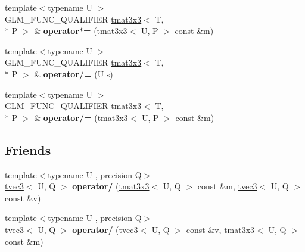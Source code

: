 \begin{DoxyCompactItemize}
\item 
\hypertarget{structglm_1_1tmat3x3_a569e06a5f10051a2022d0be0af4c5e7b}{{\footnotesize template$<$typename U $>$ }\\G\-L\-M\-\_\-\-F\-U\-N\-C\-\_\-\-Q\-U\-A\-L\-I\-F\-I\-E\-R \hyperlink{structglm_1_1tmat3x3}{tmat3x3}$<$ T, \\*
P $>$ \& {\bfseries operator$\ast$=} (\hyperlink{structglm_1_1tmat3x3}{tmat3x3}$<$ U, P $>$ const \&m)}\label{structglm_1_1tmat3x3_a569e06a5f10051a2022d0be0af4c5e7b}

\item 
\hypertarget{structglm_1_1tmat3x3_af0edea7ecc6cfc8344c91f9aeb0dcef4}{{\footnotesize template$<$typename U $>$ }\\G\-L\-M\-\_\-\-F\-U\-N\-C\-\_\-\-Q\-U\-A\-L\-I\-F\-I\-E\-R \hyperlink{structglm_1_1tmat3x3}{tmat3x3}$<$ T, \\*
P $>$ \& {\bfseries operator/=} (U s)}\label{structglm_1_1tmat3x3_af0edea7ecc6cfc8344c91f9aeb0dcef4}

\item 
\hypertarget{structglm_1_1tmat3x3_a0adc3f9a1be28dd0e4ea34c816b364fc}{{\footnotesize template$<$typename U $>$ }\\G\-L\-M\-\_\-\-F\-U\-N\-C\-\_\-\-Q\-U\-A\-L\-I\-F\-I\-E\-R \hyperlink{structglm_1_1tmat3x3}{tmat3x3}$<$ T, \\*
P $>$ \& {\bfseries operator/=} (\hyperlink{structglm_1_1tmat3x3}{tmat3x3}$<$ U, P $>$ const \&m)}\label{structglm_1_1tmat3x3_a0adc3f9a1be28dd0e4ea34c816b364fc}

\end{DoxyCompactItemize}
\subsection*{Friends}
\begin{DoxyCompactItemize}
\item 
\hypertarget{structglm_1_1tmat3x3_ac84f82f1605a6094a397c84daa80a201}{{\footnotesize template$<$typename U , precision Q$>$ }\\\hyperlink{structglm_1_1tvec3}{tvec3}$<$ U, Q $>$ {\bfseries operator/} (\hyperlink{structglm_1_1tmat3x3}{tmat3x3}$<$ U, Q $>$ const \&m, \hyperlink{structglm_1_1tvec3}{tvec3}$<$ U, Q $>$ const \&v)}\label{structglm_1_1tmat3x3_ac84f82f1605a6094a397c84daa80a201}

\item 
\hypertarget{structglm_1_1tmat3x3_a62cedcc444ac62727b8ae82f6b3249b8}{{\footnotesize template$<$typename U , precision Q$>$ }\\\hyperlink{structglm_1_1tvec3}{tvec3}$<$ U, Q $>$ {\bfseries operator/} (\hyperlink{structglm_1_1tvec3}{tvec3}$<$ U, Q $>$ const \&v, \hyperlink{structglm_1_1tmat3x3}{tmat3x3}$<$ U, Q $>$ const \&m)}\label{structglm_1_1tmat3x3_a62cedcc444ac62727b8ae82f6b3249b8}

\end{DoxyCompactItemize}


